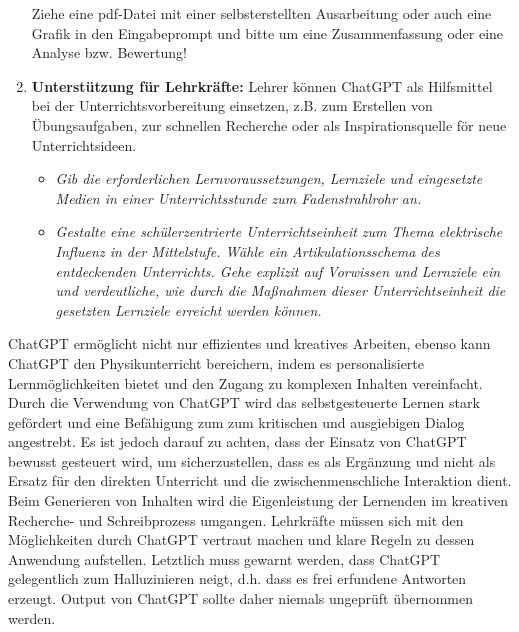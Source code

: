 \begin{enumerate}
	\begin{beisp} 
	Ziehe eine pdf-Datei mit einer selbsterstellten Ausarbeitung oder auch eine Grafik in den Eingabeprompt und bitte um eine Zusammenfassung oder eine Analyse bzw. Bewertung!
	\end{beisp}
	
	
\item \textbf{Unterst\"{u}tzung f\"{u}r Lehrkr\"{a}fte:} Lehrer k\"{o}nnen ChatGPT als Hilfsmittel bei der Unterrichtsvorbereitung einsetzen, z.B. zum Erstellen von \"{U}bungsaufgaben, zur schnellen Recherche oder als Inspirationsquelle f\"{o}r neue Unterrichtsideen. 
	\begin{beisp2}
	\begin{itemize}
	\item {\glqq}\emph{Gib die erforderlichen Lernvoraussetzungen, Lernziele und eingesetzte Medien in einer Unterrichtsstunde zum Fadenstrahlrohr an.}{\grqq} 
	\item {\glqq}\emph{Gestalte eine sch\"{u}lerzentrierte Unterrichtseinheit zum Thema elektrische Influenz in der Mittelstufe. W\"{a}hle ein Artikulationsschema des entdeckenden Unterrichts. Gehe explizit auf Vorwissen und Lernziele ein und verdeutliche, wie durch die Ma{\ss}nahmen dieser Unterrichtseinheit die gesetzten Lernziele erreicht werden k\"{o}nnen.}{\grqq} 
	\end{itemize}
	\end{beisp2}
\end{enumerate}
\bip

ChatGPT erm\"{o}glicht  nicht nur effizientes und kreatives Arbeiten, ebenso kann ChatGPT  den Physikunterricht bereichern, indem es personalisierte Lernm\"{o}glichkeiten bietet  und den Zugang zu komplexen Inhalten vereinfacht. Durch die Verwendung von ChatGPT wird das selbstgesteuerte Lernen stark gef\"{o}rdert und eine Bef\"{a}higung zum zum kritischen und ausgiebigen Dialog angestrebt.
\mip
Es ist jedoch darauf zu achten, dass der Einsatz von ChatGPT bewusst gesteuert wird, um sicherzustellen, dass es als Erg\"{a}nzung und nicht als Ersatz f\"{u}r den direkten Unterricht und die zwischenmenschliche Interaktion dient. Beim Generieren von Inhalten wird die Eigenleistung der Lernenden im kreativen Recherche- und Schreibprozess umgangen. Lehrkr\"{a}fte m\"{u}ssen sich mit den M\"{o}glichkeiten durch ChatGPT vertraut machen und klare Regeln zu dessen Anwendung aufstellen.
\mip
Letztlich muss gewarnt werden, dass ChatGPT gelegentlich zum {\glqq}Halluzinieren{\grqq} neigt, d.h. dass es frei erfundene Antworten erzeugt. Output von ChatGPT sollte daher niemals  ungepr\"{u}ft \"{u}bernommen werden. 

